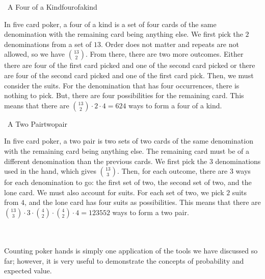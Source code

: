         \begin{exercise}{\Difficulty\,\Difficulty\,\,A Four of a Kind}{fourofakind}
        
            In five card poker, a four of a kind is a set of four cards of the same denomination with the remaining card being anything else. We first pick the \(2\) denominations from a set of \(13\). Order does not matter and repeats are not allowed, so we have \(\binom{13}{2}\). From there, there are two more outcomes. Either there are four of the first card picked and one of the second card picked or there are four of the second card picked and one of the first card pick. Then, we must consider the suits. For the denomination that has four occurrences, there is nothing to pick. But, there are four possibilities for the remaining card. This means that there are \(\binom{13}{2}\cdot2\cdot4=624\) ways to form a four of a kind.
        
        \end{exercise}
        \begin{exercise}{\Difficulty\,\Difficulty\,\,A Two Pair}{twopair}
        
            In five card poker, a two pair is two sets of two cards of the same denomination with the remaining card being anything else. The remaining card must be of a different denomination than the previous cards. We first pick the \(3\) denominations used in the hand, which gives \(\binom{13}{3}\). Then, for each outcome, there are \(3\) ways for each denomination to go: the first set of two, the second set of two, and the lone card. We must also account for suits. For each set of two, we pick \(2\) suits from \(4\), and the lone card has four suits as possibilities. This means that there are \(\binom{13}{3}\cdot3\cdot\binom{4}{2}\cdot\binom{4}{2}\cdot4=123552\) ways to form a two pair.
        
        \end{exercise}
        \vphantom
        \\
        \\
        Counting poker hands is simply one application of the tools we have discussed so far; however, it is very useful to demonstrate the concepts of probability and expected value.